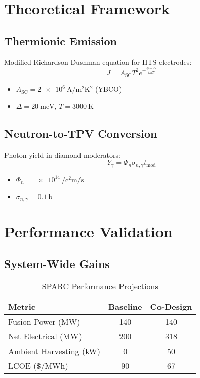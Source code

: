 \documentclass{article}
\begin{document}
\section{Theoretical Framework}
\label{sec:theory}

\subsection{Thermionic Emission}
Modified Richardson-Dushman equation for HTS electrodes:
\[
J = A_{\text{SC}} T^2 e^{-\frac{\phi - \Delta}{k_B T}}
\]
\begin{itemize}
    \item \( A_{\text{SC}} = \SI{2e6}{\ampere\per\square\meter\kelvin^2} \) (YBCO)
    \item \( \Delta = \SI{20}{\milli\electronvolt} \), \( T = \SI{3000}{\kelvin} \)
\end{itemize}

\subsection{Neutron-to-TPV Conversion}
Photon yield in diamond moderators:
\[
Y_\gamma = \Phi_n \sigma_{n,\gamma} t_{\text{mod}}
\]
\begin{itemize}
    \item \( \Phi_n = \SI{e14}{\per\square\centi\meter\per\second} \)
    \item \( \sigma_{n,\gamma} = \SI{0.1}{\barn} \)
\end{itemize}

\section{Performance Validation}
\label{sec:performance}

\subsection{System-Wide Gains}
\begin{table}[ht]
    \centering
    \caption{SPARC Performance Projections}
    \label{tab:performance}
    \begin{tabular}{lcc}
        \toprule
        \textbf{Metric} & \textbf{Baseline} & \textbf{Co-Design} \\
        \midrule
        Fusion Power (MW) & 140 & 140 \\
        Net Electrical (MW) & 200 & 318 \\
        Ambient Harvesting (kW) & 0 & 50 \\
        LCOE (\$/MWh) & 90 & 67 \\
        \bottomrule
    \end{tabular}
\end{table}
\end{document}
